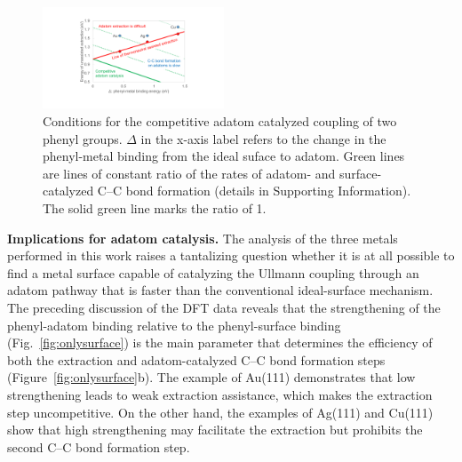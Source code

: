 \documentclass[aps,prb,amsmath,amssymb,11pt]{revtex4-1}
\newcommand{\sinfo}{Supporting Information}
\begin{document}
\begin{figure}[bt]
\centering
\includegraphics[width=0.48\textwidth]{Fig/conclusion.pdf}
\caption{Conditions for the competitive adatom catalyzed coupling of two phenyl groups. $\Delta$ in the x-axis label refers to the change in the phenyl-metal binding from the ideal suface to adatom. Green lines are lines of constant ratio of the rates of adatom- and surface-catalyzed C--C bond formation (details in \sinfo). The solid green line marks the ratio of 1. %
} 
\label{fig:conclusion}
\end{figure}

\textbf{Implications for adatom catalysis.} 
%
The analysis of the three metals performed in this work raises a tantalizing question whether it is at all possible to find a metal surface capable of catalyzing the Ullmann coupling through an adatom pathway that is faster than the conventional ideal-surface mechanism. 
The preceding discussion of the DFT data reveals that the strengthening of the phenyl-adatom binding relative to the phenyl-surface binding (Fig.~\ref{fig:onlysurface}) is the main parameter that determines the efficiency of both the extraction and adatom-catalyzed C--C bond formation steps (Figure~\ref{fig:onlysurface}b).
The example of Au(111) demonstrates that low strengthening leads to weak extraction assistance, which makes the extraction step uncompetitive. On the other hand, the examples of Ag(111) and Cu(111) show that high strengthening may facilitate the extraction but prohibits the second C--C bond formation step. 
\end{document}
